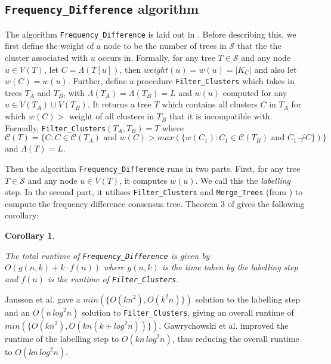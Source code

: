 \documentclass{article}
\newcommand{\compatible}{\smile}
\newcommand{\leafset}{\Lambda}
\newtheorem{freqdiffruntimecomponents}[incompatibility]{Corollary}
\begin{document}
    \subsection{\texttt{Frequency\_Difference} algorithm}
    The algorithm \texttt{Frequency\_Difference} is laid out in \cite{jansson2018algorithms}. Before describing this, we first define the weight of a node to be the number of trees in $\mathcal{S}$ that the the cluster associated with $u$ occurs in. Formally, for any tree $T \in \mathcal{S}$ and any node $u \in V(T)$, let $C = \leafset(T[u])$, then $weight(u) = w(u) = |K_C|$ and also let $w(C) = w(u)$. Further, define a procedure \texttt{Filter\_Clusters} which takes in trees $T_A$ and $T_B$, with $\leafset(T_A) = \leafset(T_B) = L$ and $w(u)$ computed for any $u \in V(T_A) \cup V(T_B)$. It returns a tree $T$ which contains all clusters $C$ in $T_A$ for which $w(C) > $ weight of all clusters in $T_B$ that it is incompatible with. Formally, \texttt{Filter\_Clusters}$(T_A, T_B) = T$ where $\mathcal{C}(T) = \{C : C \in \mathcal{C}(T_A) \text{ and } w(C) > max(\{w(C_1) : C_1 \in \mathcal{C}(T_B) \text{ and } C_1 \not\compatible C\})\}$ and $\leafset(T) = L$.

    Then the algorithm \texttt{Frequency\_Difference} runs in two parts. First, for any tree $T \in \mathcal{S}$ and any node $u \in V(T)$, it computes $w(u)$. We call this the \textit{labelling} step. In the second part, it utilises \texttt{Filter\_Clusters} and \texttt{Merge\_Trees} (from \cite{jansson2016improved}) to compute the frequency difference consensus tree. Theorem 3 of \cite{jansson2018algorithms} gives the following corollary:

    \begin{freqdiffruntimecomponents}
        \label{cor:freqdiffruntimecomponents}

        The total runtime of \texttt{Frequency\_Difference} is given by $O(g(n, k) + k \cdot f(n))$ where $g(n, k)$ is the time taken by the labelling step and $f(n)$ is the runtime of \texttt{Filter\_Clusters}.
    \end{freqdiffruntimecomponents}

    Jansson et al. \cite{jansson2018algorithms} gave a $min(\{O(kn^2), O(k^2n)\})$ solution to the labelling step and an $O(n\,log^2n)$ solution to \texttt{Filter\_Clusters}, giving an overall runtime of $min(\{O(kn^2), O(kn(k + log^2n))\})$. Gawrychowski et al. \cite{gawrychowski2017faster} improved the runtime of the labelling step to $O(kn\,log^2n)$, thus reducing the overall runtime to $O(kn\,log^2n)$.
\end{document}

